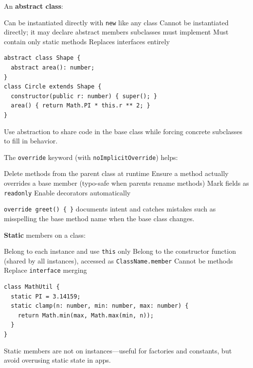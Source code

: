 \question[4]
An \textbf{abstract class}:
\begin{choices}
  \choice Can be instantiated directly with \lstinline[style=tsinline]|new| like any class
  \CorrectChoice Cannot be instantiated directly; it may declare abstract members subclasses must implement
  \choice Must contain only static methods
  \choice Replaces interfaces entirely
\end{choices}
\begin{solution}
\begin{lstlisting}[style=ts]
abstract class Shape {
  abstract area(): number;
}
class Circle extends Shape {
  constructor(public r: number) { super(); }
  area() { return Math.PI * this.r ** 2; }
}
\end{lstlisting}
  Use abstraction to share code in the base class while forcing concrete subclasses to fill in behavior.
\end{solution}

\question[4]
The \lstinline[style=tsinline]|override| keyword (with \texttt{noImplicitOverride}) helps:
\begin{choices}
  \choice Delete methods from the parent class at runtime
  \CorrectChoice Ensure a method actually overrides a base member (typo-safe when parents rename methods)
  \choice Mark fields as \lstinline[style=tsinline]|readonly|
  \choice Enable decorators automatically
\end{choices}
\begin{solution}
  \lstinline[style=tsinline]|override greet() { }| documents intent and catches mistakes such as misspelling the base method name when the base class changes.
\end{solution}

\question[4]
\textbf{Static} members on a class:
\begin{choices}
  \choice Belong to each instance and use \lstinline[style=tsinline]|this| only
  \CorrectChoice Belong to the constructor function (shared by all instances), accessed as \lstinline[style=tsinline]|ClassName.member|
  \choice Cannot be methods
  \choice Replace \lstinline[style=tsinline]|interface| merging
\end{choices}
\begin{solution}
\begin{lstlisting}[style=ts]
class MathUtil {
  static PI = 3.14159;
  static clamp(n: number, min: number, max: number) {
    return Math.min(max, Math.max(min, n));
  }
}
\end{lstlisting}
  Static members are not on instances---useful for factories and constants, but avoid overusing static state in apps.
\end{solution}

